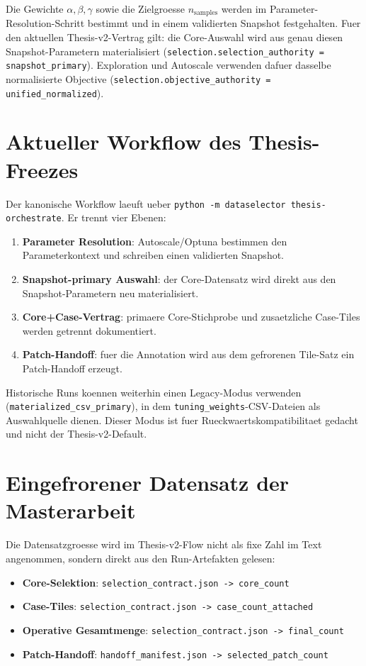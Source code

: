 Die Gewichte $\alpha, \beta, \gamma$ sowie die Zielgroesse $n_{\text{samples}}$
werden im Parameter-Resolution-Schritt bestimmt und in einem validierten
Snapshot festgehalten. Fuer den aktuellen Thesis-v2-Vertrag gilt:
die Core-Auswahl wird aus genau diesen Snapshot-Parametern materialisiert
(\texttt{selection.selection\_authority = snapshot\_primary}).
Exploration und Autoscale verwenden dafuer dasselbe normalisierte Objective
(\texttt{selection.objective\_authority = unified\_normalized}).

\section{Aktueller Workflow des Thesis-Freezes}
\label{sec:current_workflow}

Der kanonische Workflow laeuft ueber
\texttt{python -m dataselector thesis-orchestrate}. Er trennt vier Ebenen:

\begin{enumerate}
    \item \textbf{Parameter Resolution}: Autoscale/Optuna bestimmen den
          Parameterkontext und schreiben einen validierten Snapshot.
    \item \textbf{Snapshot-primary Auswahl}: der Core-Datensatz wird direkt
          aus den Snapshot-Parametern neu materialisiert.
    \item \textbf{Core+Case-Vertrag}: primaere Core-Stichprobe und zusaetzliche
          Case-Tiles werden getrennt dokumentiert.
    \item \textbf{Patch-Handoff}: fuer die Annotation wird aus dem gefrorenen
          Tile-Satz ein Patch-Handoff erzeugt.
\end{enumerate}

Historische Runs koennen weiterhin einen Legacy-Modus verwenden
(\texttt{materialized\_csv\_primary}), in dem \texttt{tuning\_weights}-CSV-Dateien
als Auswahlquelle dienen. Dieser Modus ist fuer Rueckwaertskompatibilitaet
gedacht und nicht der Thesis-v2-Default.

\section{Eingefrorener Datensatz der Masterarbeit}
\label{sec:frozen_dataset}

Die Datensatzgroesse wird im Thesis-v2-Flow nicht als fixe Zahl im Text
angenommen, sondern direkt aus den Run-Artefakten gelesen:

\begin{itemize}
    \item \textbf{Core-Selektion}: \verb|selection_contract.json -> core_count|
    \item \textbf{Case-Tiles}: \verb|selection_contract.json -> case_count_attached|
    \item \textbf{Operative Gesamtmenge}: \verb|selection_contract.json -> final_count|
    \item \textbf{Patch-Handoff}: \verb|handoff_manifest.json -> selected_patch_count|
\end{itemize}


